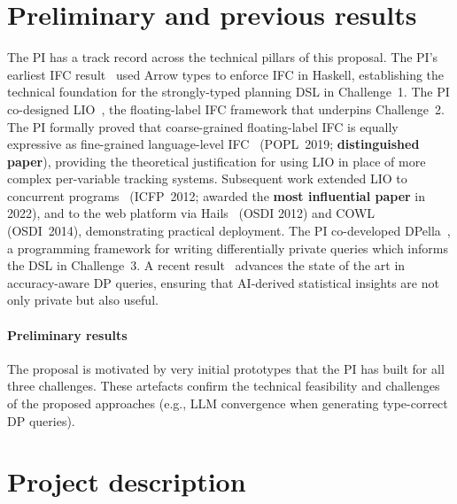 \documentclass{kaw}
\begin{document}
\section{Preliminary and previous results}
\label{sec:preliminary}

The PI has a track record across the technical pillars of this proposal.
%
The PI's earliest IFC result~\cite{Tsai:Russo:Hughes:CSF07} 
used Arrow types to enforce IFC in Haskell,
establishing the technical foundation for the strongly-typed planning DSL in
Challenge~1.
%
The PI co-designed
LIO~\cite{stefan:lio}, the floating-label IFC framework that underpins
Challenge~2.
%
The PI formally proved that coarse-grained floating-label IFC is equally
expressive as fine-grained language-level IFC~\cite{VassenaRGRS19}
(POPL~2019; \textbf{distinguished paper}), providing the theoretical
justification for using LIO in place of more complex per-variable tracking systems.
%
Subsequent work extended LIO to concurrent
programs~\cite{stefan:addressing-covert} (ICFP~2012; awarded the \textbf{most
influential paper} in 2022), and to the web platform via
Hails~\cite{giffin:hails} (OSDI 2012) and COWL~\cite{COWL} (OSDI~2014),
demonstrating practical deployment.
%
%
The PI co-developed
DPella~\cite{LoboVesga:SP20,LoboVesga:TOPLAS21}, a programming framework for
writing differentially private queries which informs the DSL in Challenge~3.
%
A recent result~\cite{Russo:CCS25} advances the state of the art in accuracy-aware
DP queries, ensuring that AI-derived statistical insights are not only private
but also useful.
%
\paragraph{Preliminary results}
The proposal is motivated by very initial prototypes that the PI has built
for all three challenges.
%
These artefacts confirm the technical feasibility and challenges of the
proposed approaches (e.g., LLM convergence when generating type-correct DP queries).


\section{Project description} \label{sec:description}
\end{document}
